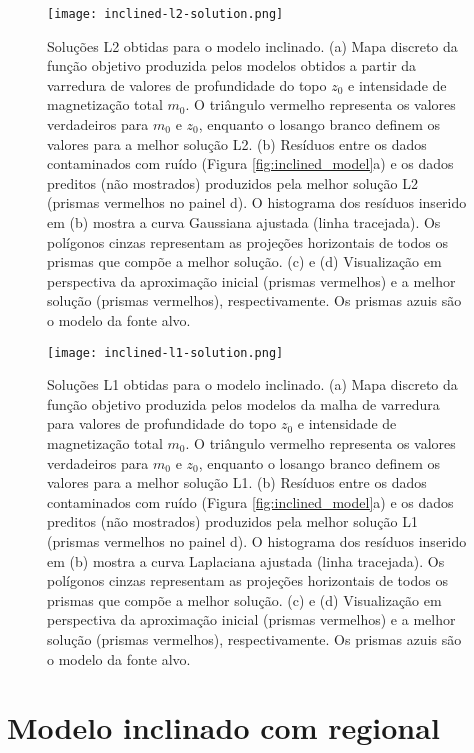 \begin{figure}[!htb]
	\centering
	\texttt{[image: inclined-l2-solution.png]}
	\caption{Soluções L2 obtidas para o modelo inclinado. 
		(a) Mapa discreto da função objetivo produzida pelos modelos obtidos a partir da varredura de valores de profundidade do topo $z_{0}$ e intensidade de magnetização total $m_{0}$. 
		O triângulo vermelho representa os valores verdadeiros para $m_{0}$ e $z_{0}$, enquanto o losango branco definem os valores para a melhor solução L2.
		(b) Resíduos entre os dados contaminados com ruído (Figura \ref{fig:inclined_model}a) 
		e os dados preditos (não mostrados) produzidos pela melhor solução L2 (prismas vermelhos no painel d). 
		O histograma dos resíduos inserido em (b) mostra a curva Gaussiana ajustada (linha tracejada).
		Os polígonos cinzas representam as projeções horizontais de todos os prismas que compõe a melhor solução. 
		(c) e (d) Visualização em perspectiva da aproximação inicial (prismas vermelhos) e 
		a melhor solução (prismas vermelhos), respectivamente. Os prismas azuis são o modelo da fonte alvo. 
	}
	\label{fig:inclined_l2_result}
\end{figure}
\pagebreak
\begin{figure}[!htb]
	\centering
	\texttt{[image: inclined-l1-solution.png]}
	\caption{Soluções L1 obtidas para o modelo inclinado. 
		(a) Mapa discreto da função objetivo produzida pelos modelos da malha de varredura para valores de profundidade do topo $z_{0}$ e intensidade de magnetização total $m_{0}$. 
		O triângulo vermelho representa os valores verdadeiros para $m_{0}$ e $z_{0}$, enquanto o losango branco definem os valores para a melhor solução L1.
		(b) Resíduos entre os dados contaminados com ruído (Figura \ref{fig:inclined_model}a) 
		e os dados preditos (não mostrados) produzidos pela melhor solução L1 (prismas vermelhos no painel d). 
		O histograma dos resíduos inserido em (b) mostra a curva Laplaciana ajustada (linha tracejada).
		Os polígonos cinzas representam as projeções horizontais de todos os prismas que compõe a melhor solução. 
		(c) e (d) Visualização em perspectiva da aproximação inicial (prismas vermelhos) e 
		a melhor solução (prismas vermelhos), respectivamente. Os prismas azuis são o modelo da fonte alvo. 
	}
	\label{fig:inclined_l1_result}
\end{figure}
\pagebreak

\section{Modelo inclinado com regional}

